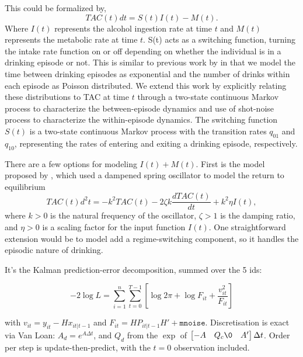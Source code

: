 This could be formalized by,
 \begin{equation}
 TAC(t) dt = S(t) I(t) - M(t).
 \end{equation}
Where $I(t)$ represents the alcohol ingestion rate at time $t$ and $M(t)$ represents the 
metabolic rate at time $t$. S(t) acts as a switching function, turning the intake rate 
function on or off depending on whether the individual is in a drinking episode or not.
This is similar to previous work by \parencite{duffy1992} in that we model the time between
drinking episodes as exponential and the number of drinks within each episode as Poisson
distributed. We extend this work by explicitly relating these distributions to TAC at time $t$
through a two-state continuous Markov process to characterize the between-episode dynamics 
and use of shot-noise process to characterize the within-episode dynamics.
The switching function $S(t)$ is a two-state continuous Markov process with the 
transition rates $q_{01}$ and $q_{10}$, representing the rates of entering and 
exiting a drinking episode, respectively. 

There are a few options for modeling $I(t) + M(t)$.
First is the model proposed by \parencite{giraldo2017a}, which used a dampened spring 
oscillator to model the return to equilibrium
\begin{equation}
    TAC(t) d^2t = -k^2TAC(t) - 2 \zeta k \frac{dTAC(t)}{dt} + k^2 \eta I(t),
\end{equation}
where $k > 0$ is the natural frequency of the oscillator, $\zeta > 1$ is the damping ratio, 
and $\eta > 0$ is a scaling factor for the input function $I(t)$. One straightforward
extension would be to model add a regime-switching component, so it handles the episodic
nature of drinking.

It's the Kalman prediction-error decomposition, summed over the 5 ids:

$$-2\log L=\sum_{i=1}^{n}\sum_{t=0}^{T-1}\left[\log 2\pi+\log F_{it}+\frac{v_{it}^2}{F_{it}}\right]$$

with $v_{it}=y_{it}-Hx_{it|t-1}$ and $F_{it}=HP_{it|t-1}H'+\texttt{mnoise}$. Discretisation is exact via Van Loan: $A_d=e^{A\Delta t}$, and $Q_d$ from the $\exp$ of $\begin{bmatrix}-A&Q_c\0&A'\end{bmatrix}\Delta t$. Order per step is update-then-predict, with the $t=0$ observation included.
